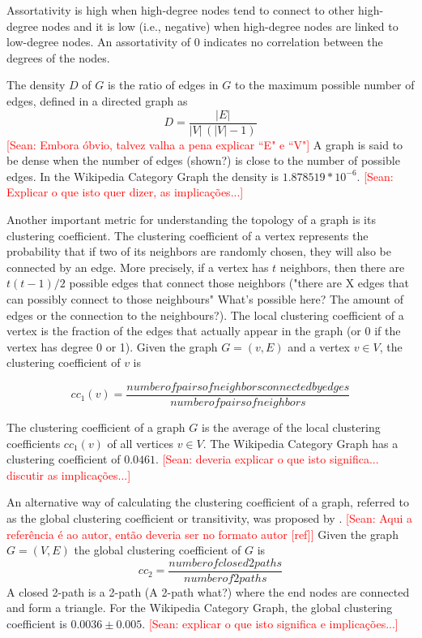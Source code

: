Assortativity is high when high-degree nodes tend to connect to other high-degree nodes and it is low (i.e., negative) when high-degree nodes are linked to low-degree nodes. An assortativity of 0 indicates no correlation between the degrees of the nodes.


The density $D$ of $G$ is the ratio of edges in $G$ to the maximum possible number of edges, defined in a directed graph as  
\begin{equation}
D={\frac  {|E|}{|V|\,(|V|-1)}}
\end{equation}
\textcolor{red}{[Sean: Embora óbvio, talvez valha a pena explicar ``E" e ``V"]} A graph is said to be dense when the number of edges (shown?) is close to the number of possible edges. In the Wikipedia Category Graph the density is $1.878519 * 10^{-6}$. \textcolor{red}{[Sean: Explicar o que isto quer dizer, as implicações...]}

Another important metric for understanding the topology of a graph is its clustering coefficient. The clustering coefficient of a vertex represents the probability that if two of its neighbors are randomly chosen, they will also be connected by an edge. More precisely, if a vertex has $t$ neighbors, then there are $t(t-1)/2$ possible edges that connect those neighbors ("there are X edges that can possibly connect to those neighbours" What's possible here? The amount of edges or the connection to the neighbours?). The local clustering coefficient of a vertex is the fraction of the edges that actually appear in the graph (or 0 if the vertex has degree 0 or 1). Given the graph $G= (v,E)$ and a vertex $v \in V$, the clustering coefficient of $v$ is 

\begin{equation}\label{eq:cc1}
cc_1(v) = \dfrac{number of pairs of neighbors connected by edges}{number of pairs of neighbors}  
\end{equation} 

The clustering coefficient of a graph $G$ is the average of the local clustering coefficients $cc_1(v)$ of all vertices $v \in V$. The Wikipedia Category Graph has a clustering coefficient of $0.0461$. \textcolor{red}{[Sean: deveria explicar o que isto significa... discutir as implicações...]}

An alternative way of calculating the clustering coefficient of a graph, referred to as the global clustering coefficient or transitivity, was proposed by \cite{newman2001random}. \textcolor{red}{[Sean: Aqui a referência é ao autor, então deveria ser no formato autor [ref]]} Given the graph $G = (V,E)$ the global clustering coefficient of $G$ is
\begin{equation}\label{eq:cc2}
cc_2 = \dfrac{number of closed 2paths}{number of 2paths}
\end{equation}
A closed 2-path is a 2-path (A 2-path what?) where the end nodes are connected and form a triangle. For the Wikipedia Category Graph, the global clustering coefficient is $0.0036\pm0.005$. \textcolor{red}{[Sean: explicar o que isto significa e implicações...]}

